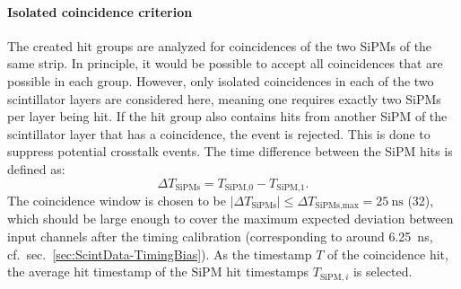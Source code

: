 \paragraph{Isolated coincidence criterion}
The created hit groups are analyzed for coincidences of the two \acp{SiPM} of the same strip. In principle, it would be possible to accept all coincidences that are possible in each group. However, only isolated coincidences in each of the two scintillator layers are considered here, meaning one requires exactly two \acp{SiPM} per layer being hit. If the hit group also contains hits from another \ac{SiPM} of the scintillator layer that has a coincidence, the event is rejected. This is done to suppress potential crosstalk events. The time difference between the \ac{SiPM} hits is defined as:
\begin{equation}
    \Delta T_\text{SiPMs} = T_\text{SiPM,0} - T_\text{SiPM,1}.
\end{equation}
The coincidence window is chosen to be $\left| \Delta T_\text{SiPMs} \right| \leq \Delta T_\text{SiPMs,max} = \SI{25}{\nano\second}$ (\SI{32}{\tu}), which should be large enough to cover the maximum expected deviation between input channels after the timing calibration (corresponding to around \SI{6.25}{\nano\second}, cf.\ sec.\ \ref{sec:ScintData-TimingBias}). As the timestamp $T$ of the coincidence hit, the average hit timestamp of the \ac{SiPM} hit timestamps $T_{\text{SiPM},i}$ is selected.
